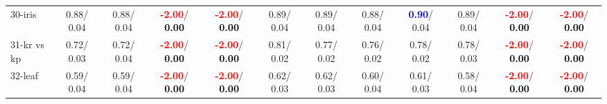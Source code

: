\begin{table}[h]
\begin{center}
{\begin{tabular}{lc|c|c|c|c|c|c|c|c|c|c}
30-iris &   0.88/  0.04 &   0.88/  0.04 & \textcolor{red}{\textbf{ -2.00}}/\textcolor{black}{\textbf{  0.00}} & \textcolor{red}{\textbf{ -2.00}}/\textcolor{black}{\textbf{  0.00}} &   0.89/  0.04 &   0.89/  0.04 &   0.88/  0.04 & \textcolor{blue}{\textbf{  0.90}}/  0.04 &   0.89/  0.04 & \textcolor{red}{\textbf{ -2.00}}/\textcolor{black}{\textbf{  0.00}} & \textcolor{red}{\textbf{ -2.00}}/\textcolor{black}{\textbf{  0.00}} \\
31-kr vs kp &   0.72/  0.03 &   0.72/  0.04 & \textcolor{red}{\textbf{ -2.00}}/\textcolor{black}{\textbf{  0.00}} & \textcolor{red}{\textbf{ -2.00}}/\textcolor{black}{\textbf{  0.00}} &   0.81/  0.02 &   0.77/  0.02 &   0.76/  0.02 &   0.78/  0.02 &   0.78/  0.03 & \textcolor{red}{\textbf{ -2.00}}/\textcolor{black}{\textbf{  0.00}} & \textcolor{red}{\textbf{ -2.00}}/\textcolor{black}{\textbf{  0.00}} \\
32-leaf &   0.59/  0.04 &   0.59/  0.04 & \textcolor{red}{\textbf{ -2.00}}/\textcolor{black}{\textbf{  0.00}} & \textcolor{red}{\textbf{ -2.00}}/\textcolor{black}{\textbf{  0.00}} &   0.62/  0.03 &   0.62/  0.03 &   0.60/  0.04 &   0.61/  0.03 &   0.58/  0.04 & \textcolor{red}{\textbf{ -2.00}}/\textcolor{black}{\textbf{  0.00}} & \textcolor{red}{\textbf{ -2.00}}/\textcolor{black}{\textbf{  0.00}} \\\end{tabular}}\label{stratsALCKappa0aRF}
\end{center}
\end{table}

